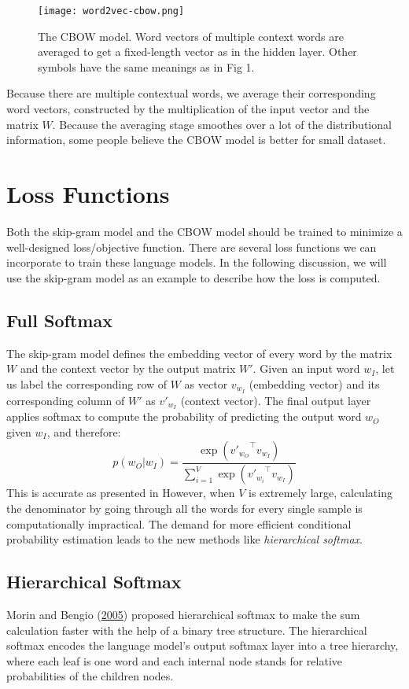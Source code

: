\begin{figure}[h]
    \centering
    \texttt{[image: word2vec-cbow.png]}
    \caption{The CBOW model. Word vectors of multiple context words are averaged to get a fixed-length vector as in the hidden layer. Other symbols have the same meanings as in Fig 1.}
\end{figure}

Because there are multiple contextual words, we average their corresponding word vectors, constructed by the multiplication of the input vector and the matrix $W$. Because the averaging stage smoothes over a lot of the distributional information, some people believe the CBOW model is better for small dataset.

\section{Loss Functions}
Both the skip-gram model and the CBOW model should be trained to minimize a well-designed loss/objective function. There are several loss functions we can incorporate to train these language models. In the following discussion, we will use the skip-gram model as an example to describe how the loss is computed.

\subsection{Full Softmax}
The skip-gram model defines the embedding vector of every word by the matrix $W$ and the context vector by the output matrix $W'$. Given an input word $w_I$, let us label the corresponding row of $W$ as vector $v_{w_I}$ (embedding vector) and its corresponding column of $W'$ as $v'_{w_I}$ (context vector). The final output layer applies softmax to compute the probability of predicting the output word $w_O$ given $w_I$, and therefore:
\[
p(w_O \vert w_I) = \frac{\exp({v'_{w_O}}^{\top} v_{w_I})}{\sum_{i=1}^V \exp({v'_{w_i}}^{\top} v_{w_I})}
\]
This is accurate as presented in However, when $V$ is extremely large, calculating the denominator by going through all the words for every single sample is computationally impractical. The demand for more efficient conditional probability estimation leads to the new methods like \emph{hierarchical softmax}.

\subsection{Hierarchical Softmax}
Morin and Bengio (\href{https://www.iro.umontreal.ca/~lisa/pointeurs/hierarchical-nnlm-aistats05.pdf}{2005}) proposed hierarchical softmax to make the sum calculation faster with the help of a binary tree structure. The hierarchical softmax encodes the language model's output softmax layer into a tree hierarchy, where each leaf is one word and each internal node stands for relative probabilities of the children nodes.

